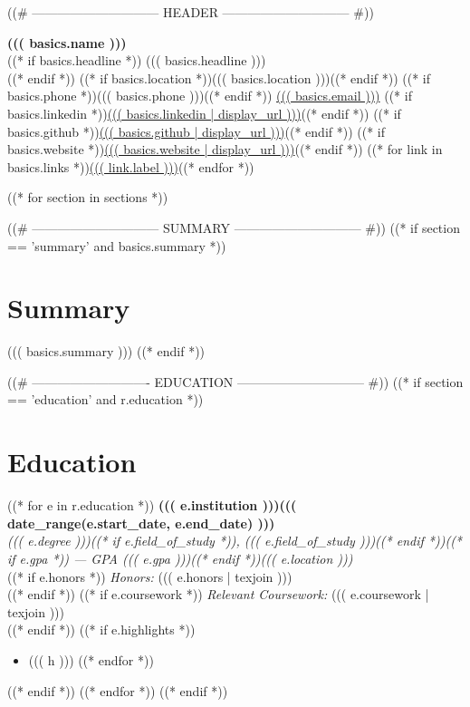 \documentclass[10pt,letterpaper]{article}
\newcommand{\cvsep}{\hspace{5pt}\textperiodcentered\hspace{5pt}}
\newcommand{\entryheading}[4]{%
  \needspace{3\baselineskip}%
  \textbf{#1}\hfill\textbf{#2}\\%
  \textit{\color{muted}#3}\hfill\textit{\color{muted}#4}\\[2pt]%
}
\begin{document}
((# ------------------------------ HEADER ------------------------------ #))
\begin{center}
  {\LARGE\bfseries ((( basics.name )))}\\[4pt]
  ((* if basics.headline *))
  {\color{muted}((( basics.headline )))}\\[4pt]
  ((* endif *))
  \small
  ((* if basics.location *))((( basics.location )))\cvsep((* endif *))%
  ((* if basics.phone *))((( basics.phone )))\cvsep((* endif *))%
  \href{mailto:((( basics.email | url )))}{((( basics.email )))}%
  ((* if basics.linkedin *))\cvsep\href{((( basics.linkedin | url )))}{((( basics.linkedin | display_url )))}((* endif *))%
  ((* if basics.github *))\cvsep\href{((( basics.github | url )))}{((( basics.github | display_url )))}((* endif *))%
  ((* if basics.website *))\cvsep\href{((( basics.website | url )))}{((( basics.website | display_url )))}((* endif *))%
  ((* for link in basics.links *))\cvsep\href{((( link.url | url )))}{((( link.label )))}((* endfor *))
\end{center}
\vspace{2pt}

((* for section in sections *))

((# ------------------------------ SUMMARY ------------------------------ #))
((* if section == 'summary' and basics.summary *))
\section{Summary}
((( basics.summary )))
((* endif *))

((# ---------------------------- EDUCATION ------------------------------ #))
((* if section == 'education' and r.education *))
\section{Education}
((* for e in r.education *))
\entryheading
  {((( e.institution )))}
  {((( date_range(e.start_date, e.end_date) )))}
  {((( e.degree )))((* if e.field_of_study *)), ((( e.field_of_study )))((* endif *))((* if e.gpa *)) \textnormal{---} GPA ((( e.gpa )))((* endif *))}
  {((( e.location )))}
((* if e.honors *))
\textit{Honors:} ((( e.honors | texjoin )))\\[2pt]
((* endif *))
((* if e.coursework *))
\textit{Relevant Coursework:} ((( e.coursework | texjoin )))\\[2pt]
((* endif *))
((* if e.highlights *))
\begin{itemize}
((* for h in e.highlights *))
  \item ((( h )))
((* endfor *))
\end{itemize}
((* endif *))
\vspace{2pt}
((* endfor *))
((* endif *))
\end{document}
